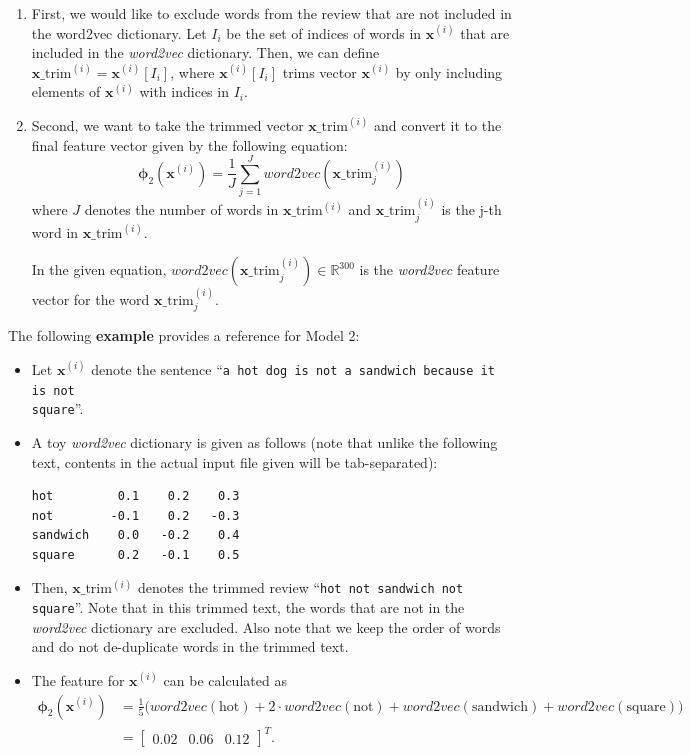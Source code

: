 \documentclass[11pt,addpoints,answers]{exam}
\newcommand{\xv}{\mathbf{x}}
\begin{document}
\begin{enumerate}
    \item First, we would like to exclude words from the review that are not included in the word2vec dictionary. Let ${I_i}$ be the set of indices of words in $\xv^{(i)}$ that are included in the \emph{word2vec} dictionary. Then, we can define $\xv\_\text{trim}^{(i)} = \xv^{(i)}[I_i]$, where $\xv^{(i)}[I_i]$ trims vector $\xv^{(i)}$ by only including elements of $\xv^{(i)}$ with indices in $I_i$. 
    \item Second, we want to take the trimmed vector $\xv\_\text{trim}^{(i)}$ and convert it to the final feature vector given by the following equation:
    $$\boldsymbol{\phi}_2\left(\xv^{(i)}\right) = \frac{1}{J} \sum_{j=1}^J word2vec(\xv\_\text{trim}^{(i)}_j) $$
    where $J$ denotes the number of words in $\xv\_\text{trim}^{(i)}$ and $\xv\_\text{trim}^{(i)}_j$ is the j-th word in $\xv\_\text{trim}^{(i)}$.
    
     In the given equation, $word2vec(\xv\_\text{trim}^{(i)}_j) \in \mathbb{R}^{300}$ is the \emph{word2vec} feature vector for the word $\xv\_\text{trim}^{(i)}_j$.
\end{enumerate}
    
The following \textbf{example} provides a reference for Model 2:

\begin{itemize}
    \item Let $\xv^{(i)}$ denote the sentence ``\texttt{a hot dog is not a sandwich because it is not\\ square}''.
    \item A toy \emph{word2vec} dictionary is given as follows (note that unlike the following text, contents in the actual input file given will be tab-separated): 
    \begin{lstlisting}
hot         0.1    0.2    0.3
not        -0.1    0.2   -0.3
sandwich    0.0   -0.2    0.4
square      0.2   -0.1    0.5
    \end{lstlisting}
    \item Then, $\xv\_\text{trim}^{(i)}$ denotes the trimmed review ``\texttt{hot not sandwich not square}''. Note that in this trimmed text, the words that are not in the \emph{word2vec} dictionary are excluded. Also note that we keep the order of words and do not de-duplicate words in the trimmed text.
    \item The feature for $\xv^{(i)}$ can be calculated as
        \begin{align*} \boldsymbol{\phi}_2(\xv^{(i)}) &= \frac{1}{5}\big( word2vec(\text{hot}) + 2 \cdot word2vec(\text{not}) + word2vec(\text{sandwich}) + word2vec(\text{square}) \big) \\
        &= \begin{bmatrix} 0.02 & 0.06 & 0.12 \end{bmatrix}^T.
        \end{align*}
\end{itemize}
\end{document}
